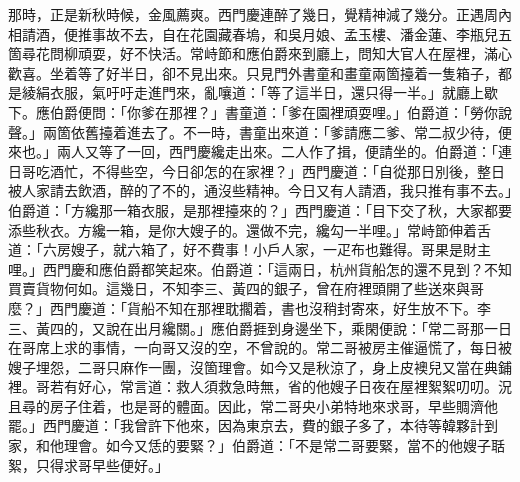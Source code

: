 那時，正是新秋時候，金風薦爽。西門慶連醉了幾日，覺精神減了幾分。正遇周內相請酒，便推事故不去，自在花園藏春塢，和吳月娘、孟玉樓、潘金蓮、李瓶兒五箇尋花問柳頑耍，好不快活。{}常峙節和應伯爵來到廳上，問知大官人在屋裡，滿心歡喜。坐着等了好半日，卻不見出來。只見門外書童和畫童兩箇擡着一隻箱子，都是綾絹衣服，氣吁吁走進門來，亂嚷道：「等了這半日，還只得一半。」就廳上歇下。應伯爵便問：「你爹在那裡？」書童道：「爹在園裡頑耍哩。」伯爵道：「勞你說聲。」兩箇依舊擡着進去了。不一時，書童出來道：「爹請應二爹、常二叔少待，便來也。」兩人又等了一回，西門慶纔走出來。二人作了揖，便請坐的。伯爵道：「連日哥吃酒忙，不得些空，今日卻怎的在家裡？」西門慶道：「自從那日別後，整日被人家請去飲酒，醉的了不的，通沒些精神。今日又有人請酒，我只推有事不去。」伯爵道：「方纔那一箱衣服，是那裡擡來的？」西門慶道：「目下交了秋，大家都要添些秋衣。方纔一箱，是你大嫂子的。還做不完，纔勾一半哩。」常峙節伸着舌道：「六房嫂子，就六箱了，好不費事！小戶人家，一疋布也難得。哥果是財主哩。」{}西門慶和應伯爵都笑起來。伯爵道：「這兩日，杭州貨船怎的還不見到？不知買賣貨物何如。這幾日，不知李三、黃四的銀子，曾在府裡頭開了些送來與哥麼？」西門慶道：「貨船不知在那裡耽擱着，書也沒稍封寄來，好生放不下。李三、黃四的，又說在出月纔關。」應伯爵捱到身邊坐下，乘閑便說：{}「常二哥那一日在哥席上求的事情，一向哥又沒的空，不曾說的。常二哥被房主催逼慌了，每日被嫂子埋怨，二哥只麻作一團，沒箇理會。如今又是秋涼了，身上皮襖兒又當在典鋪裡。哥若有好心，常言道：救人須救急時無，省的他嫂子日夜在屋裡絮絮叨叨。況且尋的房子住着，也是哥的體面。因此，常二哥央小弟特地來求哥，早些賙濟他罷。」西門慶道：「我曾許下他來，因為東京去，費的銀子多了，本待等韓夥計到家，和他理會。如今又恁的要緊？」伯爵道：「不是常二哥要緊，當不的他嫂子聒絮，只得求哥早些便好。」

